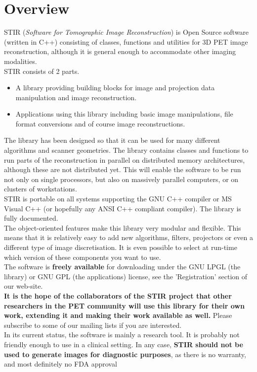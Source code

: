 \documentclass{article}
\begin{document}
\section{
Overview}

STIR (\textit{Software for Tomographic Image Reconstruction}) is Open 
Source software (written in C++) consisting of classes, functions 
and utilities for 3D PET image reconstruction, although it is 
general enough to accommodate other imaging modalities. \\
STIR consists of 2 parts. 
\begin{itemize}
\item
A library providing building blocks for image and projection 
data manipulation and image reconstruction.
\item
Applications using this library including basic image manipulations, 
file format conversions and of course image reconstructions.
\end{itemize}

The library has been designed so that it can be used for many 
different algorithms and scanner geometries. The library contains 
classes and functions to run parts of the reconstruction in parallel 
on distributed memory architectures, although these are not distributed 
yet. This will enable the software to be run not only on single 
processors, but also on massively parallel computers, or on clusters 
of workstations. \\
STIR is portable on all systems supporting the GNU C++ compiler 
or MS Visual C++ (or hopefully any ANSI C++ compliant compiler). 
The library is fully documented.\\
The object-oriented features make this library very modular and 
flexible. This means that it is relatively easy to add new algorithms, 
filters, projectors or even a different type of image discretisation. 
It is even possible to select at run-time which version of these 
components you want to use.\\
The software is \textbf{freely available} for downloading under the 
GNU LPGL (the library) or GNU GPL (the applications) license, 
see the 'Registration' section of our web-site. \\
\textbf{It is the hope of the collaborators of the STIR project that 
other researchers in the PET community will use this library 
for their own work, extending it and making their work available 
as well.} Please subscribe to some of our mailing 
lists if you are interested. \\
In its current status, the software is mainly a research tool. 
It is probably not friendly enough to use in a clinical setting. In any 
case, \textbf{STIR should not be used to generate images for diagnostic
purposes}, as there is no warranty, and most definitely no FDA approval
\end{document}
